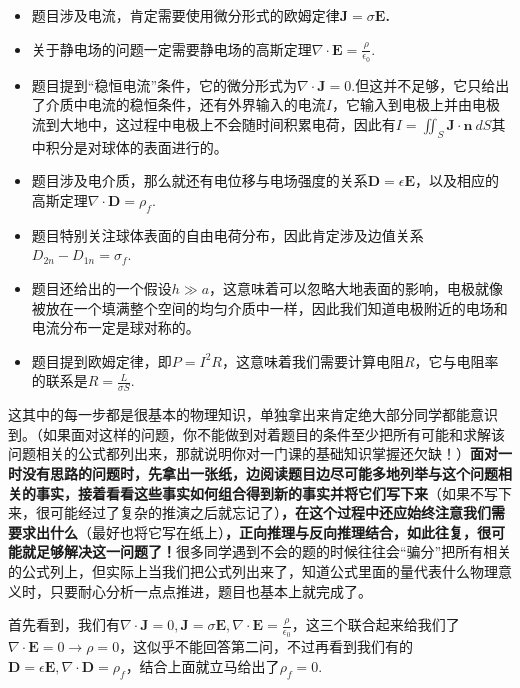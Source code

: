 \documentclass{ctexart}
\begin{document}
\begin{myexample}
\begin{enumerate}[leftmargin=*, labelsep=0.5em]
    \begin{itemize}
      \item 题目涉及电流，肯定需要使用微分形式的欧姆定律$\mathbf{J} = \sigma\mathbf{E}$\textbf{.}
      \item 关于静电场的问题一定需要静电场的高斯定理$\nabla \cdot \mathbf{E} = \frac{\rho}{\epsilon_{0}}$.
      \item 题目提到“稳恒电流”条件，它的微分形式为$\nabla \cdot \mathbf{J} = 0$.但这并不足够，它只给出了介质中电流的稳恒条件，还有外界输入的电流$I$，它输入到电极上并由电极流到大地中，这过程中电极上不会随时间积累电荷，因此有$I = \iint_{S}^{}{\mathbf{J} \cdot \mathbf{n}\ dS}$其中积分是对球体的表面进行的。
      \item 题目涉及电介质，那么就还有电位移与电场强度的关系$\mathbf{D} = \epsilon\mathbf{E}$，以及相应的高斯定理$\nabla \cdot \mathbf{D} = \rho_{f}$.
      \item 题目特别关注球体表面的自由电荷分布，因此肯定涉及边值关系$D_{2n} - D_{1n} = \sigma_{f}$.
      \item 题目还给出的一个假设$h \gg a$，这意味着可以忽略大地表面的影响，电极就像被放在一个填满整个空间的均匀介质中一样，因此我们知道电极附近的电场和电流分布一定是球对称的。
      \item 题目提到欧姆定律，即$P = I^{2}R$，这意味着我们需要计算电阻$R$，它与电阻率的联系是$R = \frac{L}{\sigma S}$.
    \end{itemize}
    
    这其中的每一步都是很基本的物理知识，单独拿出来肯定绝大部分同学都能意识到。（如果面对这样的问题，你不能做到对着题目的条件至少把所有可能和求解该问题相关的公式都列出来，那就说明你对一门课的基础知识掌握还欠缺！）\textbf{面对一时没有思路的问题时，先拿出一张纸，边阅读题目边尽可能多地列举与这个问题相关的事实，接着看看这些事实如何组合得到新的事实并将它们写下来}（如果不写下来，很可能经过了复杂的推演之后就忘记了）\textbf{，在这个过程中还应始终注意我们需要求出什么}（最好也将它写在纸上）\textbf{，正向推理与反向推理结合，如此往复，很可能就足够解决这一问题了！}很多同学遇到不会的题的时候往往会“骗分”把所有相关的公式列上，但实际上当我们把公式列出来了，知道公式里面的量代表什么物理意义时，只要耐心分析一点点推进，题目也基本上就完成了。
    
    首先看到，我们有$\nabla \cdot \mathbf{J} = 0,\mathbf{J} = \sigma\mathbf{E},\nabla \cdot \mathbf{E} = \frac{\rho}{\epsilon_{0}}$，这三个联合起来给我们了$\nabla \cdot \mathbf{E} = 0 \rightarrow \rho = 0$，这似乎不能回答第二问，不过再看到我们有的$\mathbf{D} = \epsilon\mathbf{E,}\nabla \cdot \mathbf{D} = \rho_{f}$，结合上面就立马给出了$\rho_{f} = 0$.
    

\end{enumerate}
\end{myexample}
\end{document}
